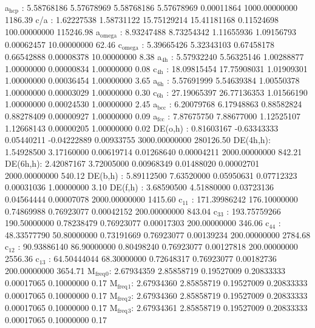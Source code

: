 \documentclass[11pt]{article}
\begin{document}
a\(_{\text{hcp}}\)   :   5.58768186   5.57678969   5.58768186   5.57678969   0.00011864 1000.00000000      1186.39
c/a     :   1.62227538   1.58731122  15.75129214  15.41181168   0.11524698 100.00000000    115246.98
a\(_{\text{omega}}\) :   8.93247488   8.73254342   1.11655936   1.09156793   0.00062457  10.00000000        62.46
c\(_{\text{omega}}\) :   5.39665426   5.32343103   0.67458178   0.66542888   0.00008378  10.00000000         8.38
a\(_{\text{4h}}\)    :   5.57932240   5.56325146   1.00288877   1.00000000   0.00000834   1.00000000         0.08
c\(_{\text{4h}}\)    :  18.09815454  17.75908031   1.01909301   1.00000000   0.00036454   1.00000000         3.65
a\(_{\text{6h}}\)    :   5.57691999   5.54639384   1.00550378   1.00000000   0.00003029   1.00000000         0.30
c\(_{\text{6h}}\)    :  27.19065397  26.77136353   1.01566190   1.00000000   0.00024530   1.00000000         2.45
a\(_{\text{bcc}}\)   :   6.20079768   6.17948863   0.88582824   0.88278409   0.00000927   1.00000000         0.09
a\(_{\text{fcc}}\)   :   7.87675750   7.88677000   1.12525107   1.12668143   0.00000205   1.00000000         0.02
DE(o,h) :   0.81603167  -0.63343333   0.05440211  -0.04222889   0.00933755 3000.00000000    280126.50
DE(4h,h):   1.54928500   3.17160000   0.00619714   0.01268640   0.00004211 2000.00000000       842.21
DE(6h,h):   2.42087167   3.72005000   0.00968349   0.01488020   0.00002701 2000.00000000       540.12
DE(b,h) :   5.89112500   7.63520000   0.05950631   0.07712323   0.00031036   1.00000000         3.10
DE(f,h) :   3.68590500   4.51880000   0.03723136   0.04564444   0.00007078 2000.00000000      1415.60
c\(_{\text{11}}\)    : 171.39986242 176.10000000   0.74869988   0.76923077   0.00042152 200.00000000       843.04
c\(_{\text{33}}\)    : 193.75759266 190.50000000   0.78238479   0.76923077   0.00017303 200.00000000       346.06
c\(_{\text{44}}\)    :  48.33577790  50.80000000   0.73191669   0.76923077   0.00139234 200.00000000      2784.68
c\(_{\text{12}}\)    :  90.93886140  86.90000000   0.80498240   0.76923077   0.00127818 200.00000000      2556.36
c\(_{\text{13}}\)    :  64.50444044  68.30000000   0.72648317   0.76923077   0.00182736 200.00000000      3654.71
M\(_{\text{freq}}\)\(_{\text{0}}\):   2.67934359   2.85858719   0.19527009   0.20833333   0.00017065   0.10000000         0.17
M\(_{\text{freq}}\)\(_{\text{1}}\):   2.67934360   2.85858719   0.19527009   0.20833333   0.00017065   0.10000000         0.17
M\(_{\text{freq}}\)\(_{\text{2}}\):   2.67934360   2.85858719   0.19527009   0.20833333   0.00017065   0.10000000         0.17
M\(_{\text{freq}}\)\(_{\text{3}}\):   2.67934361   2.85858719   0.19527009   0.20833333   0.00017065   0.10000000         0.17
\end{document}
